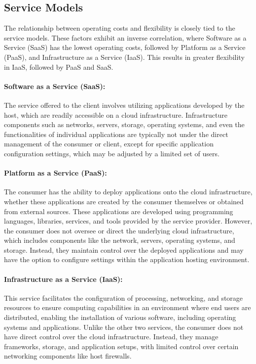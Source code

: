 \documentclass{article}
\begin{document}
\subsection{Service Models}
The relationship between operating costs and flexibility is closely tied to the service models. These factors exhibit an inverse correlation, where Software as a Service (SaaS) has the lowest operating costs, followed by Platform as a Service (PaaS), and Infrastructure as a Service (IaaS). This results in greater flexibility in IaaS, followed by PaaS and SaaS.

\paragraph{Software as a Service (SaaS):} The service offered to the client involves utilizing applications developed by the host, which are readily accessible on a cloud infrastructure. Infrastructure components such as networks, servers, storage, operating systems, and even the functionalities of individual applications are typically not under the direct management of the consumer or client, except for specific application configuration settings, which may be adjusted by a limited set of users.

\paragraph{Platform as a Service (PaaS):} The consumer has the ability to deploy applications onto the cloud infrastructure, whether these applications are created by the consumer themselves or obtained from external sources. These applications are developed using programming languages, libraries, services, and tools provided by the service provider. However, the consumer does not oversee or direct the underlying cloud infrastructure, which includes components like the network, servers, operating systems, and storage. Instead, they maintain control over the deployed applications and may have the option to configure settings within the application hosting environment.

\paragraph{Infrastructure as a Service (IaaS):} This service facilitates the configuration of processing, networking, and storage resources to ensure computing capabilities in an environment where end users are distributed, enabling the installation of various software, including operating systems and applications. Unlike the other two services, the consumer does not have direct control over the cloud infrastructure. Instead, they manage frameworks, storage, and application setups, with limited control over certain networking components like host firewalls.
\end{document}
